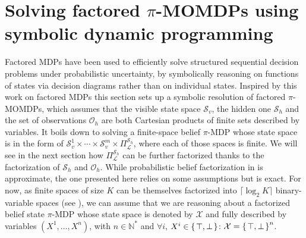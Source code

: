 \section{Solving factored $\pi$-MOMDPs using symbolic dynamic programming} 
\label{section_PPUDD}
Factored MDPs \cite{Hoey99spudd:stochastic} 
have been used to efficiently solve structured
sequential decision problems under probabilistic uncertainty, by symbolically
reasoning on functions of states via decision diagrams rather than on individual
states. Inspired by this work on factored MDPs 
this section sets up a symbolic resolution of
factored $\pi$-MOMDPs, which assumes that 
the visible state space $\mathcal{S}_v$, 
the hidden one $\mathcal{S}_h$ 
and the set of observations $\mathcal{O}_h$
are both Cartesian products of finite sets described by variables. 
It boils down to solving a finite-space belief $\pi$-MDP 
whose state space is in the form of 
$\mathcal{S}^1_v \times \cdots \times \mathcal{S}^m_v \times \Pi^{\mathcal{S}_h}_{\mathcal{L}}$, 
where each of those spaces is finite. 
We will see in the next section how $\Pi^{\mathcal{S}_h}_{\mathcal{L}}$ 
can be further factorized thanks to the factorization of $\mathcal{S}_h$
and $\mathcal{O}_h$. 
While probabilistic belief factorization 
in \cite{DBLP:conf/aaai/BoyenK99,DBLP:conf/aips/ShaniPBS08} 
is approximate, the one presented here relies on some assumptions but is exact. 
For now, as finite spaces of size $K$ can be themselves
factorized into $\lceil \log_2 K \rceil$ binary-variable spaces (see
\cite{Hoey99spudd:stochastic}), we can assume that we are reasoning about a
factorized belief state $\pi$-MDP whose state space is denoted by $\mathcal{X}$
and fully described by variables $(X^1,\ldots,X^n)$, with  $n \in
\mathbb{N}^{\ast}$ and $\forall i$, $X^i \in \left\{ \left. \top,\bot \right. \right\}$:
$\mathcal{X} = \left\{ \left. \top,\bot \right. \right\}^n$.


